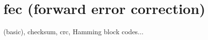 % 
%

\section{fec (forward error correction)}
\label{module:fec}
(basic), checksum, crc, Hamming block codes...

